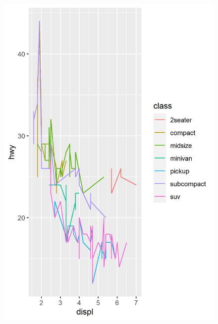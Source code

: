 \documentclass{article}
\begin{document}
\begin{figure}[H]
\centering
\includegraphics[width=1\textwidth]{../figures/mpg_line_plot.jpeg}
\caption{\protect{}}
\end{figure}
\clearpage
\end{document}
